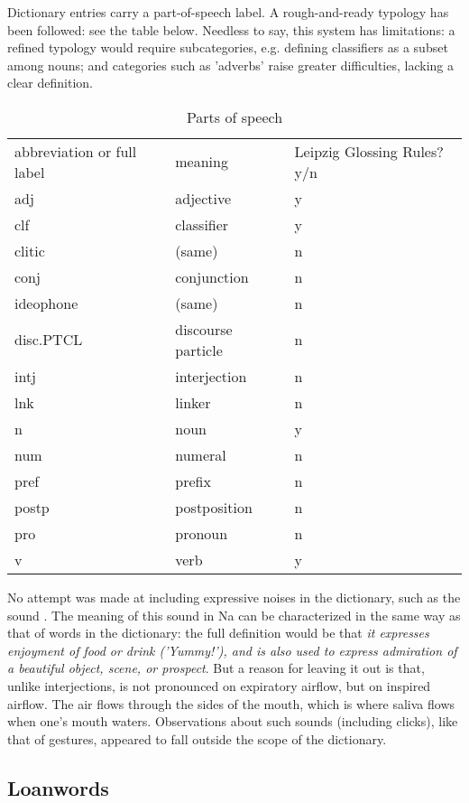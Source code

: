 Dictionary entries carry a part-of-speech label. A rough-and-ready typology has been followed: see the table below. Needless to say, this system has limitations: a refined typology would require subcategories, e.g. defining classifiers as a subset among nouns; and categories such as 'adverbs' raise greater difficulties, lacking a clear definition.
\begin{table}
	\caption{Parts of speech}
	\begin{tabular}{lll}
		abbreviation or full label & meaning & Leipzig Glossing Rules? y/n \\
		adj & adjective & y \\
		clf & classifier & y \\
		clitic & (same) & n \\
		conj & conjunction & n \\
		ideophone & (same) & n \\
		disc.PTCL & discourse particle & n \\
		intj & interjection & n \\
		lnk & linker & n \\
		n & noun & y \\
		num & numeral & n \\
		pref & prefix & n \\
		postp & postposition & n \\
		pro & pronoun & n \\
		v & verb & y \\
	\end{tabular}
\end{table}

No attempt was made at including expressive noises in the dictionary, such as the sound . The meaning of this sound in Na can be characterized in the same way as that of words in the dictionary: the full definition would be that  \textit{it expresses enjoyment of food or drink ('Yummy!'), and is also used to express admiration of a beautiful object, scene, or prospect}. But a reason for leaving it out is that, unlike interjections,   is not pronounced on expiratory airflow, but on inspired airflow. The air flows through the sides of the mouth, which is where saliva flows when one's mouth waters. Observations about such sounds (including clicks), like that of gestures, appeared to fall outside the scope of the dictionary.

	\subsection{Loanwords} \label{sec:loan}


